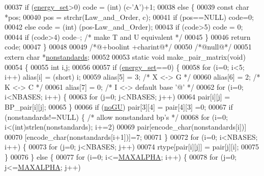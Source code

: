 \begin{DoxyCode}
00037   \textcolor{keywordflow}{if} (\hyperlink{group__model__details_gafb1ef1166da85092ae8a325e02dcae71}{energy\_set}>0) code = (int) (c-\textcolor{charliteral}{'A'})+1;
00038   \textcolor{keywordflow}{else} \{
00039     \textcolor{keyword}{const} \textcolor{keywordtype}{char} *pos;
00040     pos = strchr(Law\_and\_Order, c);
00041     \textcolor{keywordflow}{if} (pos==NULL) code=0;
00042     \textcolor{keywordflow}{else} code = (int) (pos-Law\_and\_Order);
00043     \textcolor{keywordflow}{if} (code>5) code = 0;
00044     \textcolor{keywordflow}{if} (code>4) code--; \textcolor{comment}{/* make T and U equivalent */}
00045   \}
00046   \textcolor{keywordflow}{return} code;
00047 \}
00048 
00049 \textcolor{comment}{/*@+boolint +charint@*/}
00050 \textcolor{comment}{/*@null@*/}
00051 \textcolor{keyword}{extern} \textcolor{keywordtype}{char} *\hyperlink{group__model__details_ga2695d91cc535d09c2eae5c3884e2ec64}{nonstandards};
00052 
00053 \textcolor{keyword}{static} \textcolor{keywordtype}{void} make\_pair\_matrix(\textcolor{keywordtype}{void})
00054 \{
00055    \textcolor{keywordtype}{int} i,j;
00056 
00057    \textcolor{keywordflow}{if} (\hyperlink{group__model__details_gafb1ef1166da85092ae8a325e02dcae71}{energy\_set}==0) \{
00058       \textcolor{keywordflow}{for} (i=0; i<5; i++) alias[i] = (\textcolor{keywordtype}{short}) i;
00059       alias[5] = 3; \textcolor{comment}{/* X <-> G */}
00060       alias[6] = 2; \textcolor{comment}{/* K <-> C */}
00061       alias[7] = 0; \textcolor{comment}{/* I <-> default base '@' */}
00062       \textcolor{keywordflow}{for} (i=0; i<NBASES; i++) \{
00063           \textcolor{keywordflow}{for} (j=0; j<NBASES; j++)
00064             pair[i][j] = BP\_pair[i][j];
00065       \}
00066       \textcolor{keywordflow}{if} (\hyperlink{group__model__details_gabf380d09e4f1ab94fc6af57cf0ad5d32}{noGU}) pair[3][4] = pair[4][3] =0;
00067       \textcolor{keywordflow}{if} (nonstandards!=NULL) \{  \textcolor{comment}{/* allow nonstandard bp's */}
00068          \textcolor{keywordflow}{for} (i=0; i<(int)strlen(nonstandards); i+=2)
00069             pair[encode\_char(nonstandards[i])]
00070               [encode\_char(nonstandards[i+1])]=7;
00071       \}
00072       \textcolor{keywordflow}{for} (i=0; i<NBASES; i++) \{
00073           \textcolor{keywordflow}{for} (j=0; j<NBASES; j++)
00074            rtype[pair[i][j]] = pair[j][i];
00075       \}
00076    \} \textcolor{keywordflow}{else} \{
00077       \textcolor{keywordflow}{for} (i=0; i<=\hyperlink{group__model__details_ga05a5ffe718aa431d97419a12fb082379}{MAXALPHA}; i++) \{
00078          \textcolor{keywordflow}{for} (j=0; j<=\hyperlink{group__model__details_ga05a5ffe718aa431d97419a12fb082379}{MAXALPHA}; j++)

\end{DoxyCode}
